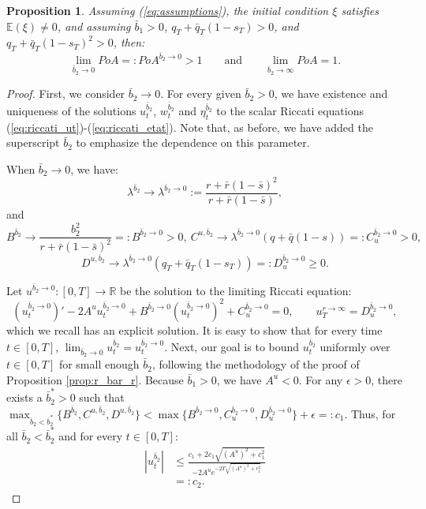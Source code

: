 \documentclass[11pt]{article}
\newtheorem{proposition}{Proposition}
\begin{document}
\begin{proposition}
	Assuming (\ref{eq:assumptions}), the initial condition $\xi$ satisfies $\mathbb{E}(\xi)\neq 0$, and assuming $\bar{b}_1> 0$, $q_T+\bar{q}_T(1-s_T)>0$, and $q_T+\bar{q}_T(1-s_T)^2>0$, then:
	\begin{equation*}
	\lim_{\bar{b}_2 \to 0} PoA =: PoA^{\bar{b}_2\to 0} > 1\qquad \text{and} \qquad\lim_{\bar{b}_2 \to \infty} PoA = 1.
	\end{equation*}
	\label{prop:b2bar}
\end{proposition}
\begin{proof}
	First, we consider $\bar{b}_2 \to 0$. For every given $\bar{b}_2 >0$, we have existence and uniqueness of the solutions $u^{\bar{b}_2}_t$, $w^{\bar{b}_2}_t$ and $\eta^{\bar{b}_2}_t$ to the scalar Riccati equations (\ref{eq:riccati_ut})-(\ref{eq:riccati_etat}). Note that, as before, we have added the superscript $\bar{b}_2$ to emphasize the dependence on this parameter.
	
	When $\bar{b}_2 \to 0$, we have:
	$$\displaystyle \lambda^{\bar{b}_2} \to \lambda^{\bar{b}_2 \to 0} := \frac{r + \bar{r}(1- \bar{s})^2}{r + \bar{r}(1-\bar{s})},$$
	and 
	$$B^{\bar{b}_2} \to \frac{b_2^2}{r + \bar{r}(1-\bar{s})^2}=:B^{\bar{b}_2 \to 0} > 0,\ C^{u,\bar{b}_2} \to \lambda^{\bar{b}_2 \to 0}(q+\bar{q}(1-s))=:C^{\bar{b}_2 \to 0}_u >0,$$
	$$D^{u,\bar{b}_2} \to \lambda^{\bar{b}_2 \to 0}(q_T+\bar{q}_T(1-s_T))=:D^{\bar{b}_2 \to 0}_u \geq 0.$$
	
	Let $u^{\bar{b}_2 \to 0}:[0,T]\to \mathbb{R}$ be the solution to the limiting Riccati equation:
	\begin{equation}
	\left({u}^{{\bar{b}_2 \to 0}}_t\right)' - 2A^u u_t^{\bar{b}_2 \to 0} +B^{\bar{b}_2 \to 0} (u_t^{\bar{b}_2 \to 0})^2+ C^{\bar{b}_2 \to 0}_u = 0, \qquad u_T^{r \to \infty} = D^{\bar{b}_2 \to 0}_u,
	\end{equation}
	which we recall has an explicit solution. It is easy to show that for every time $t\in [0,T]$, $\lim_{\bar{b}_2 \to 0}u^{\bar{b}_2}_t=u^{\bar{b}_2 \to 0}_t$. Next, our goal is to bound $u^{\bar{b}_2}_t$ uniformly over $t \in [0,T]$ for small enough $\bar{b}_2$, following the methodology of the proof of Proposition \ref{prop:r_bar_r}. Because $\bar{b}_1 > 0$, we have $A^u < 0$. For any $\epsilon>0$, there exists a $\bar{b}^*_2>0$ such that $\max_{\bar{b}_2<\bar{b}^*_2} \{ B^{\bar{b}_2},C^{u,\bar{b}_2},D^{u,\bar{b}_2} \}<\max \{B^{\bar{b}_2 \to 0},C^{\bar{b}_2 \to 0}_u,D^{\bar{b}_2 \to 0}_u \}+\epsilon=:c_1$. Thus, for all $\bar{b}_2<\bar{b}^*_2$ and for every $t \in [0,T]$:
	\begin{equation*}
	\begin{split}
		\left| u_t^{\bar{b}_2} \right| &\leq \frac{c_1 + 2 c_1 \sqrt{(A^u)^2 + c_1^2}}{-2A^u e^{-2T \sqrt{(A^u)^2 + c_1^2}}} \\
		&=:c_2.
	\end{split}
	\end{equation*}
	

\end{proof}
\end{document}
